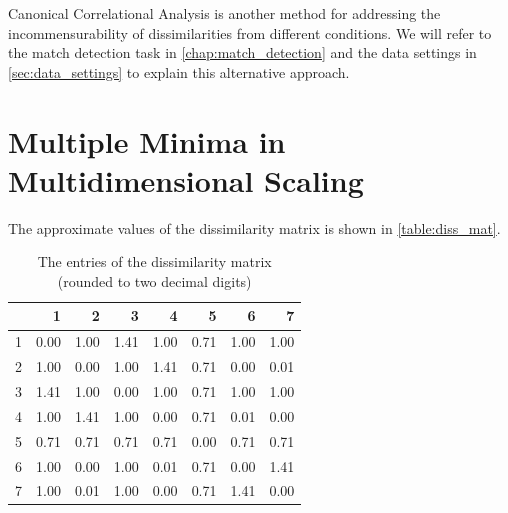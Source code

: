 \documentclass[12pt,oneside,final]{thesis}\usepackage[]{graphicx}\usepackage[]{color}
\begin{document}
Canonical Correlational Analysis is another method for addressing the incommensurability of dissimilarities from different conditions. We will refer to the match detection task in \autoref{chap:match_detection} and the data settings in \autoref{sec:data_settings} to explain this alternative approach.




\chapter{Multiple Minima in  Multidimensional Scaling }
\label{sec:MultMinima}


The approximate values of the dissimilarity matrix is shown in \autoref{table:diss_mat}.

\begin{table}[ht]
\centering
\ttfamily
\begin{tabular}{r|rrrrrrr}
  \hline
 & 1 & 2 & 3 & 4 & 5 & 6 & 7 \\ 
  \hline
  1 & 0.00 & 1.00 & 1.41 & 1.00 & 0.71 &1.00 & 1.00  \\ 
  2 & 1.00 & 0.00 & 1.00 & 1.41 & 0.71 & 0.00 & 0.01 \\ 
  3 & 1.41 & 1.00 & 0.00 & 1.00 & 0.71 & 1.00 & 1.00  \\ 
  4 & 1.00 & 1.41 & 1.00 & 0.00 & 0.71 & 0.01 & 0.00  \\ 
  5 & 0.71 & 0.71 & 0.71 & 0.71 & 0.00 & 0.71 & 0.71   \\ 
  6 & 1.00 & 0.00 & 1.00 & 0.01 & 0.71 & 0.00 & 1.41  \\ 
  7 & 1.00 & 0.01 & 1.00 & 0.00 & 0.71 & 1.41 & 0.00  \\ 
  
   \hline
\end{tabular}

\caption{The entries of the dissimilarity matrix (rounded to two decimal digits)\label{table:diss_mat}}
\end{table}
\end{document}
